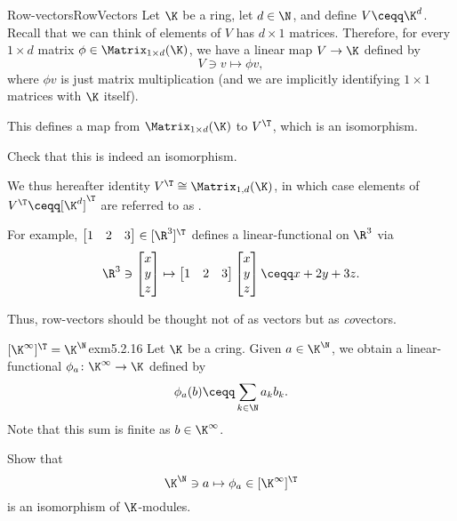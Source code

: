\begin{exm}{Row-vectors}{RowVectors}
	Let $\K$ be a ring, let $d\in \N$, and define $V\ceqq \K ^d$.  Recall that we can think of elements of $V$ has $d\times 1$ matrices.  Therefore, for every $1\times d$ matrix $\phi \in \Matrix _{1\times d}(\K )$, we have a linear map $V\rightarrow \K$ defined by
	\begin{equation}
	V\ni v\mapsto \phi v,
	\end{equation}
	where $\phi v$ is just matrix multiplication (and we are implicitly identifying $1\times 1$ matrices with $\K$ itself).
	
	This defines a map from $\Matrix _{1\times d}(\K )$ to $V^{\T}$, which is an isomorphism.
	\begin{exr}[breakable=false]{}{}
		Check that this is indeed an isomorphism.
	\end{exr}
	
	We thus hereafter identity $V^{\T}\cong \Matrix _{1,d}(\K )$, in which case elements of $V^{\T}\ceqq [\K ^d]^{\T}$ are referred to as .
	
	For example, $\begin{bmatrix}1 & 2 & 3\end{bmatrix}\in [\R ^3]^{\T}$ defines a linear-functional on $\R ^3$ via
	\begin{equation}
	\R ^3\ni \begin{bmatrix}x \\ y \\ z\end{bmatrix}\mapsto \begin{bmatrix}1 & 2 & 3\end{bmatrix}\begin{bmatrix}x \\ y \\ z\end{bmatrix}\ceqq x+2y+3z.
	\end{equation}
	\begin{rmk}
		Thus, row-vectors should be thought not of as vectors but as \emph{co}vectors.
	\end{rmk}
\end{exm}
\begin{exm}{$[\K ^{\infty}]^{\T}=\K ^{\N}$}{exm5.2.16}
	Let $\K$ be a cring.  Given $a\in \K ^{\N}$, we obtain a linear-functional $\phi _a\colon \K ^{\infty}\rightarrow \K$ defined by
	\begin{equation}
	\phi _a(b)\ceqq \sum _{k\in \N}a_kb_k.
	\end{equation}
	Note that this sum is finite as $b\in \K ^{\infty}$.
	\begin{exr}[breakable=false]{}{}
		Show that
		\begin{equation}
		\K ^{\N}\ni a\mapsto \phi _a\in [\K ^{\infty}]^{\T}
		\end{equation}
		is an isomorphism of $\K$-modules.
	\end{exr}
\end{exm}


